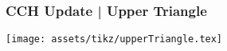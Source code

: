 \begin{frame}
    \frametitle{CCH Update | Upper Triangle}

    \texttt{[image: assets/tikz/upperTriangle.tex]}

\end{frame}
